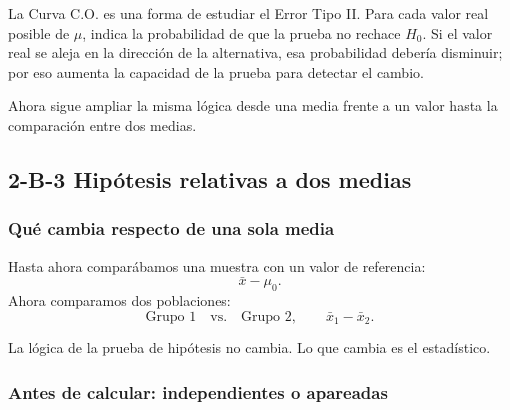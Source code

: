 \documentclass[11pt,a4paper]{article}
\begin{document}
\begin{oral}
La Curva C.O. es una forma de estudiar el Error Tipo II. Para cada valor real posible de $\mu$, indica la probabilidad de que la prueba no rechace $H_0$. Si el valor real se aleja en la dirección de la alternativa, esa probabilidad debería disminuir; por eso aumenta la capacidad de la prueba para detectar el cambio.
\end{oral}

\begin{regla}
Ahora sigue ampliar la misma lógica desde una media frente a un valor hasta la comparación entre dos medias.
\end{regla}

\subsection{2-B-3 Hipótesis relativas a dos medias}

\subsubsection{Qué cambia respecto de una sola media}

Hasta ahora comparábamos una muestra con un valor de referencia:
\[
\boxed{\bar{x}-\mu_0}.
\]
Ahora comparamos dos poblaciones:
\[
\boxed{\text{Grupo 1}}\quad\text{vs.}\quad\boxed{\text{Grupo 2}},
\qquad \boxed{\bar{x}_1-\bar{x}_2}.
\]
\begin{ideaclave}
La lógica de la prueba de hipótesis no cambia. Lo que cambia es el estadístico.
\end{ideaclave}

\subsubsection{Antes de calcular: independientes o apareadas}
\end{document}
